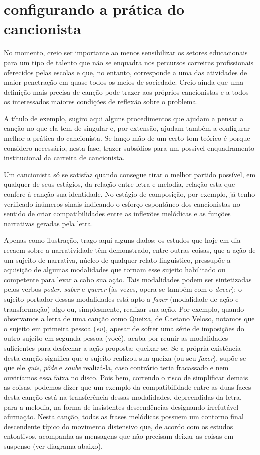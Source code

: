 \section{configurando a prática do cancionista}

No momento, creio ser importante ao menos sensibilizar os setores
educacionais para um tipo de talento que não se enquadra nos percursos
carreiras profissionais oferecidos pelas escolas e que, no entanto,
corresponde a uma das atividades de maior penetração em quase todos os
meios de sociedade. Creio ainda que uma definição mais precisa de canção
pode trazer aos próprios cancionistas e a todos os interessados maiores
condições de reflexão sobre o problema.

A título de exemplo, sugiro aqui alguns procedimentos que ajudam a
pensar a canção no que ela tem de singular e, por extensão, ajudam
também a configurar melhor a prática do cancionista. Se lanço mão de um
certo tom teórico é porque considero necessário, nesta fase, trazer
subsídios para um possível enquadramento institucional da carreira de
cancionista.

Um cancionista só se satisfaz quando consegue tirar o melhor partido
possível, em qualquer de seus estágios, da relação entre letra e
melodia, relação esta que confere à canção sua identidade. No estágio de
composição, por exemplo, já tenho verificado inúmeros sinais indicando o
esforço espontâneo dos cancionistas no sentido de criar
compatibilidades entre as inflexões melódicas e as funções narrativas
geradas pela letra.

Apenas como ilustração, trago aqui alguns dados: os estudos que hoje em
dia recaem sobre a narratividade têm demonstrado, entre outras coisas,
que a ação de um sujeito de narrativa, núcleo de qualquer relato
linguístico, pressupõe a aquisição de algumas modalidades que tornam
esse sujeito habilitado ou competente para levar a cabo sua ação. Tais
modalidades podem ser sintetizadas pelos verbos \textit{poder}, \textit{saber} e
\textit{querer} (às vezes, opera-se também com o \textit{dever}); o sujeito
portador dessas modalidades está apto a \textit{fazer} (modalidade de ação e
transformação) algo ou, simplesmente, realizar sua ação. Por exemplo,
quando observamos a letra de uma canção como Queixa, de Caetano Veloso,
notamos que o sujeito em primeira pessoa (\textit{eu}), apesar de sofrer uma
série de imposições do outro sujeito em segunda pessoa (você), acaba por
reunir as modalidades suficientes para desfechar a ação proposta:
queixar-se. Se a própria existência desta canção significa que o sujeito
realizou sua queixa (ou seu \textit{fazer}), supõe-se que ele \textit{quis},
\textit{pôde} e \textit{soube} realizá-la, caso contrário teria fracassado e nem
ouviríamos essa faixa no disco. Pois bem, correndo o risco de
simplificar demais as coisas, podemos dizer que um exemplo da
compatibilidade entre as duas faces desta canção está na transferência
dessas modalidades, depreendidas da letra, para a melodia, na forma de
insistentes descendências designando irrefutável afirmação. Nesta
canção, todas as frases melódicas possuem um contorno final descendente
típico do movimento distensivo que, de acordo com os estudos entoativos,
acompanha as mensagens que não precisam deixar as coisas em suspenso
(ver diagrama abaixo).

